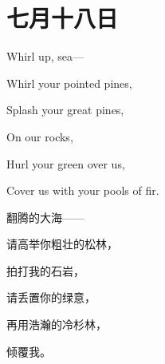 \section{七月十八日}
{Whirl up, sea---
	
	Whirl your pointed pines, 　　
	
	Splash your great pines,
	
	On our rocks, 　　
	
	Hurl your green over us,
	
	Cover us with your pools of fir.
}{翻腾的大海——

请高举你粗壮的松林，

拍打我的石岩，

请丢置你的绿意，

再用浩瀚的冷杉林，

倾覆我。
}
